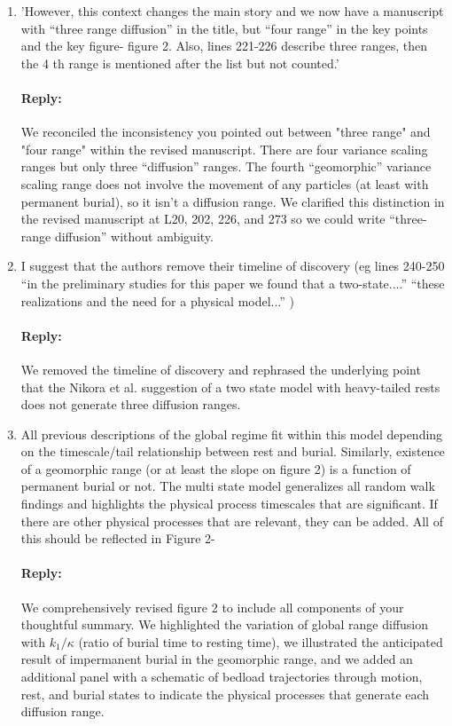 \documentclass[11pt]{article}
\begin{document}
\begin{enumerate}
\item 'However, this context changes the main story and we now have a manuscript with “three range diffusion” in the title, but “four range” in the key points and the key figure- figure 2. Also, lines 221-226 describe three ranges, then the 4 th range is mentioned after the list but not counted.'
\paragraph{Reply:} 
We reconciled the inconsistency you pointed out between "three range" and "four range" within the revised manuscript. There are four variance scaling ranges but only three ``diffusion'' ranges. The fourth ``geomorphic'' variance scaling range does not involve the movement of any particles (at least with permanent burial), so it isn't a diffusion range. We clarified this distinction in the revised manuscript at L20, 202, 226, and 273 so we could write ``three-range diffusion'' without ambiguity. 

\item I suggest that the authors remove their timeline of discovery (eg lines 240-250 “in the preliminary studies for this paper we found that a two-state....” “these realizations and the need for a physical model...” )
\paragraph{Reply:}
We removed the timeline of discovery and rephrased the underlying point that the Nikora et al. suggestion of a two state model with heavy-tailed rests does not generate three diffusion ranges. 

\item  All previous descriptions of the global regime fit within this model depending on the timescale/tail relationship between rest and burial. Similarly, existence of a geomorphic range (or at least the slope on figure 2) is a function of permanent burial or not. The multi state model generalizes all random walk findings and highlights the physical process timescales that are significant. If there are other physical processes that are relevant, they can be
added. All of this should be reflected in Figure 2-
\paragraph{Reply:} 
We comprehensively revised figure 2 to include all components of your thoughtful summary. We highlighted the variation of global range diffusion with $k_1/\kappa$ (ratio of burial time to resting time), we illustrated the anticipated result of impermanent burial in the geomorphic range, and we added an additional panel with a schematic of bedload trajectories through motion, rest, and burial states to indicate the physical processes that generate each diffusion range.
\end{enumerate}
\end{document}
